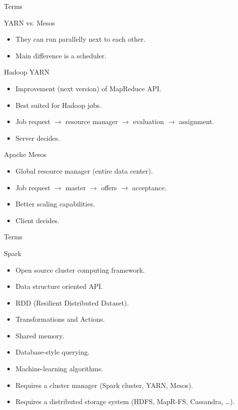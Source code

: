 \begin{frame}{Terms}
  \begin{block}{YARN vs. Mesos}
    \begin{itemize}
      \item They can run parallelly next to each other. 
      \item Main difference is a scheduler.
    \end{itemize}
  \end{block}
  \begin{block}{Hadoop YARN}
    \begin{itemize}
      \item Improvement (next version) of MapReduce API. 
      \item Best suited for Hadoop jobs.
      \item Job request $\rightarrow$ resource manager $\rightarrow$ evaluation $\rightarrow$ assignment.
      \item Server decides.
    \end{itemize}
  \end{block}
  \begin{block}{Apache Mesos}
    \begin{itemize}
      \item Global resource manager (entire data center).
      \item Job request $\rightarrow$ master $\rightarrow$ offers $\rightarrow$ acceptance.
      \item Better scaling capabilities.
      \item Client decides.
    \end{itemize}
  \end{block}
\end{frame}

\begin{frame}{Terms}
  \begin{block}{Spark}
    \begin{itemize}
      \item Open source cluster computing framework.
      \item Data structure oriented API.
      \item RDD (Resilient Distributed Dataset).
      \item Transformations and Actions.
      \item Shared memory.
      \item Database-style querying.
      \item Machine-learning algorithms.
      \item Requires a cluster manager (Spark cluster, YARN, Mesos).
      \item Requires a distributed storage system (HDFS, MapR-FS, Cassandra, \dots).
    \end{itemize}
  \end{block}
\end{frame}


